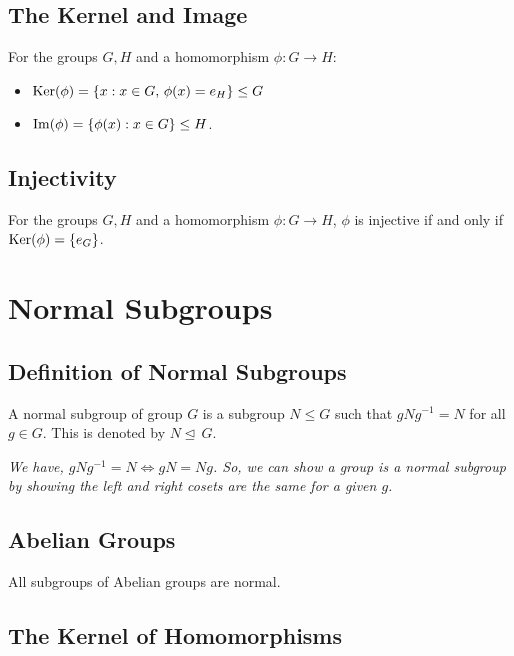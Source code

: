 \documentclass[a4paper, 12pt, twoside]{article}
\begin{document}
\subsection{The Kernel and Image}

For the groups $G, H$ and a homomorphism $\phi : G \to H$:

\begin{itemize}
      \item $\operatorname{Ker}(\phi) = \{x : x \in G, \, \phi(x) = e_H\} \leq G$
      \item $\operatorname{Im}(\phi) = \{\phi(x) : x \in G\} \leq H$.
\end{itemize}

\subsection{Injectivity}

For the groups $G, H$ and a homomorphism $\phi : G \to H$,
$\phi$ is injective if and only if $\operatorname{Ker}(\phi) = \{e_G\}$.

\newpage

\section{Normal Subgroups}

\subsection{Definition of Normal Subgroups}

A normal subgroup of group $G$ is a subgroup $N \leq G$
such that $gNg^{-1} = N$ for all $g \in G$. This is denoted by
$N \unlhd \, G$.

\vspace{\baselineskip}

\textit{We have, $gNg^{-1} = N \Leftrightarrow gN = Ng$. So, we can show a
group is a normal subgroup by showing the left and right
cosets are the same for a given $g$.}

\subsection{Abelian Groups}

All subgroups of Abelian groups are normal.

\subsection{The Kernel of Homomorphisms}
\end{document}
